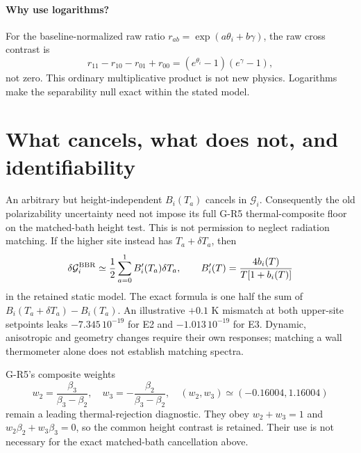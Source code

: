 \documentclass[11pt,a4paper]{article}
\begin{document}
\paragraph{Why use logarithms?}
For the baseline-normalized raw ratio $r_{ab}=\exp(a\theta_i+b\gamma)$,
the raw cross contrast is
\begin{equation}
 r_{11}-r_{10}-r_{01}+r_{00}
 =(e^{\theta_i}-1)(e^\gamma-1),
\end{equation}
not zero. This ordinary multiplicative product is not new physics.
Logarithms make the separability null exact within the stated model.

\newpage
\section{What cancels, what does not, and identifiability}
An arbitrary but height-independent $B_i(T_a)$ cancels in
$\mathcal G_i$. Consequently the old polarizability uncertainty need
not impose its full G-R5 thermal-composite floor on the matched-bath
height test. This is not permission to neglect radiation matching.
If the higher site instead has $T_a+\delta T_a$, then
\begin{equation}\label{eq:leak}
 \delta\mathcal G_i^{\rm BBR}
 \simeq\frac12\sum_{a=0}^1 B_i'(T_a)\delta T_a,\qquad
 B_i'(T)=\frac{4b_i(T)}{T[1+b_i(T)]}
\end{equation}
in the retained static model. The exact formula is one half the sum
of $B_i(T_a+\delta T_a)-B_i(T_a)$.
An illustrative $+0.1$ K mismatch at both upper-site setpoints leaks
$-7.345\,10^{-19}$ for E2 and $-1.013\,10^{-19}$ for E3.
Dynamic, anisotropic and geometry changes require their own responses;
matching a wall thermometer alone does not establish matching spectra.

G-R5's composite weights
\begin{equation}
 w_2=\frac{\beta_3}{\beta_3-\beta_2},\quad
 w_3=-\frac{\beta_2}{\beta_3-\beta_2},\quad
 (w_2,w_3)\simeq(-0.16004,1.16004)
\end{equation}
remain a leading thermal-rejection diagnostic. They obey
$w_2+w_3=1$ and $w_2\beta_2+w_3\beta_3=0$, so the common height
contrast is retained. Their use is not necessary for the exact
matched-bath cancellation above.
\end{document}
